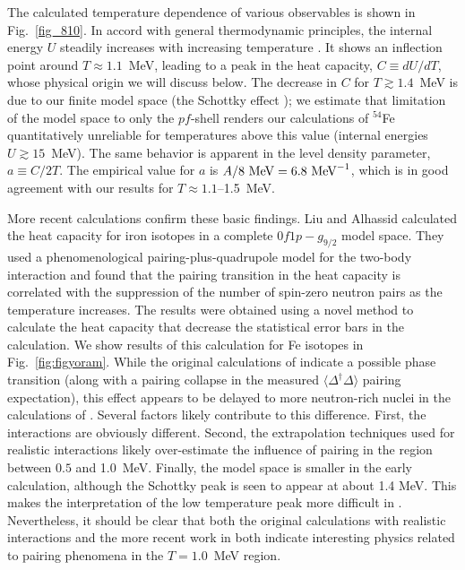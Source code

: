 \documentclass[rmp,aps,floatfix]{revtex4}
\begin{document}
The calculated temperature dependence of various observables is shown in
Fig.~\ref{fig_810}. 
In accord with general thermodynamic principles, the internal energy
$U$ steadily increases with increasing temperature \cite{Dean95}. It shows an
inflection point around $T \approx 1.1$~MeV, leading to a peak in the heat
capacity, $C\equiv dU/dT$, whose physical origin we will discuss below. The
decrease in $C$ for $T \gtrsim 1.4$~MeV is due to our finite model space (the
Schottky effect \cite{Schottky});
we estimate that limitation of the model space to only
the $pf$-shell renders our calculations of ${}^{54}$Fe quantitatively
unreliable for temperatures above this value (internal energies $U\gtrsim
15$~MeV). The same behavior is apparent in the level density parameter,
$a\equiv C/2T$. The empirical value for $a$ is $A/8~{\rm MeV} =6.8~{\rm
MeV}^{-1}$, which is in good agreement with our results for $T \approx
1.1$--1.5~MeV.

More recent calculations confirm these basic findings. Liu and Alhassid
calculated \cite{liu01} the heat capacity for iron isotopes in a complete $0f1p-g_{9/2}$
model space. They used a phenomenological pairing-plus-quadrupole model 
for the two-body interaction and found that the pairing transition
in the heat capacity is correlated with the suppression of the number
of spin-zero neutron pairs as the temperature increases. The results were
obtained using a novel method to calculate the heat capacity that decrease
the statistical error bars in the calculation. We show results of this
calculation for Fe isotopes in Fig.~\ref{fig:figyoram}. 
While the 
original calculations of \cite{Dean95} indicate a possible phase
transition (along with a pairing collapse in the measured 
$\langle \Delta^\dagger\Delta \rangle$ pairing expectation), this effect
appears to be delayed to more neutron-rich nuclei in the calculations of
\cite{liu01}. Several factors likely contribute to this difference. 
First, the  interactions are obviously different. Second, the 
extrapolation techniques used for realistic interactions likely 
over-estimate the influence of pairing in the region between $0.5$ 
and 1.0~MeV.  Finally, the model space is smaller in the early calculation,
although the Schottky peak is seen to appear at about 1.4 MeV. This 
makes the interpretation of the low temperature peak more difficult 
in \cite{Dean95}.
Nevertheless, it should be clear that both the original calculations 
with realistic interactions and the more recent work in \cite{liu01}
both indicate interesting physics related to pairing 
phenomena in the $T=1.0$~MeV region. 
\end{document}
